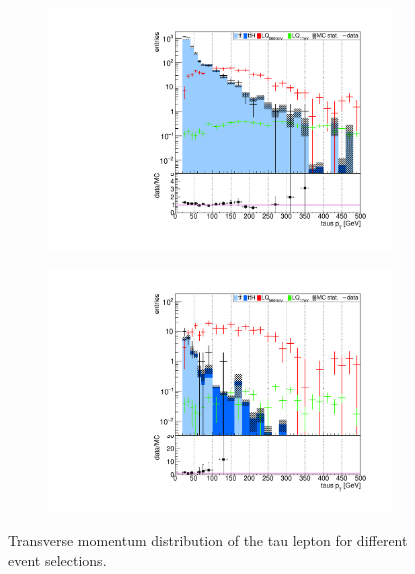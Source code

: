 \begin{figure}
\begin{subfigure}[t]{0.49\textwidth}
                \label{taupt:2b2tau}
                \end{subfigure}
                \begin{subfigure}[t]{0.49\textwidth}
                \includegraphics[width=\textwidth]{figures/plots/kinLQ75/tau_pT_2j1b_1tau.pdf}
                \label{taupt:1b1tau}
                \end{subfigure}
                \begin{subfigure}[t]{0.49\textwidth}
                \includegraphics[width=\textwidth]{figures/plots/kinLQ75/tau_pT_2j1b_2tau.pdf}
                \label{taupt:1b2tau}
                \end{subfigure}
\caption[Transverse momentum distribution of the tau lepton for different event selections.]{Transverse momentum distribution of the tau lepton for different event selections.}
\label{taupt}
\end{figure}
